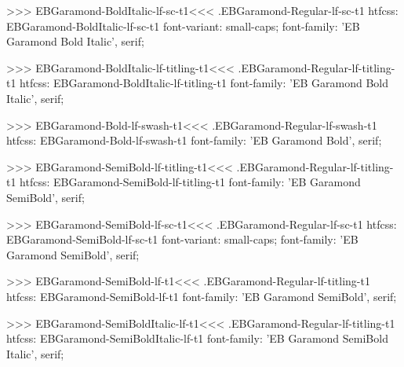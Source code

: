 {{{{{{{>>>
\<EBGaramond-BoldItalic-lf-sc-t1\><<<
.EBGaramond-Regular-lf-sc-t1
htfcss:  EBGaramond-BoldItalic-lf-sc-t1  font-variant: small-caps; font-family: 'EB Garamond Bold Italic', serif;

>>>
\<EBGaramond-BoldItalic-lf-titling-t1\><<<
.EBGaramond-Regular-lf-titling-t1
htfcss:  EBGaramond-BoldItalic-lf-titling-t1  font-family: 'EB Garamond Bold Italic', serif;

>>>
\<EBGaramond-Bold-lf-swash-t1\><<<
.EBGaramond-Regular-lf-swash-t1
htfcss:  EBGaramond-Bold-lf-swash-t1  font-family: 'EB Garamond Bold', serif;

>>>
\<EBGaramond-SemiBold-lf-titling-t1\><<<
.EBGaramond-Regular-lf-titling-t1
htfcss:  EBGaramond-SemiBold-lf-titling-t1  font-family: 'EB Garamond SemiBold', serif;

>>>
\<EBGaramond-SemiBold-lf-sc-t1\><<<
.EBGaramond-Regular-lf-sc-t1
htfcss:  EBGaramond-SemiBold-lf-sc-t1  font-variant: small-caps; font-family: 'EB Garamond SemiBold', serif;

>>>
\<EBGaramond-SemiBold-lf-t1\><<<
.EBGaramond-Regular-lf-titling-t1
htfcss:  EBGaramond-SemiBold-lf-t1  font-family: 'EB Garamond SemiBold', serif;

>>>
\<EBGaramond-SemiBoldItalic-lf-t1\><<<
.EBGaramond-Regular-lf-titling-t1
htfcss:  EBGaramond-SemiBoldItalic-lf-t1  font-family: 'EB Garamond SemiBold Italic', serif;

}}}}}}}
